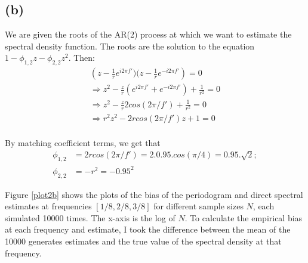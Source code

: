 \documentclass[a4paper,10pt]{article}
\theoremstyle{mytheor}
\begin{document}
\subsection*{(b)}
We are given the roots of the AR(2) process at which we want to estimate the spectral density function. The roots are the solution to the equation $1-\phi_{1,2}z - \phi_{2,2}z^2$. Then:
\begin{align*}
    \left(z-\frac{1}{r}e^{i2\pi f'})(z-\frac{1}{r}e^{-i2\pi f'}\right) = 0 \\
    \Longrightarrow z^2 -\frac{z}{r}(e^{i2\pi f'} + e^{-i2\pi f'}) + \frac{1}{r^2} = 0 \\
    \Longrightarrow z^2 -\frac{z}{r}2cos(2\pi/f') + \frac{1}{r^2} = 0 \\
     \Longrightarrow r^2z^2 -2rcos(2\pi/f')z + 1 = 0 \\
\end{align*}

By matching coefficient terms, we get that 
\begin{align*}
    \phi_{1,2} & = 2rcos(2\pi/f') = 2.0.95.cos(\pi/4) = 0.95.\sqrt{2}; \\
    \phi_{2,2} & = -r^2 = -0.95^2
\end{align*}

Figure \ref{plot2b} shows the plots of the bias of the periodogram and direct spectral estimates at frequencies $[1/8,2/8,3/8]$ for different sample sizes $N$, each simulated 10000 times. The x-axis is the log of $N$. To calculate the empirical bias at each frequency and estimate, I took the difference between the mean of the 10000 generates estimates and the true value of the spectral density at that frequency.
\end{document}
